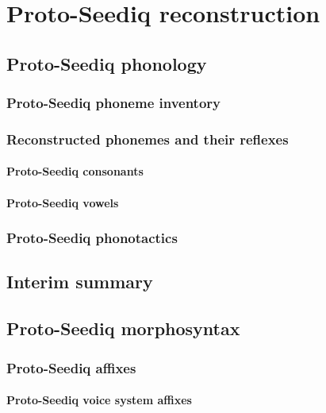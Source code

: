 \documentclass[master]{NTHUthesis}
\begin{document}
\chapter{Proto-Seediq reconstruction}
\lipsum[1-2]

\section{Proto-Seediq phonology}

\subsection{Proto-Seediq phoneme inventory}

\subsection{Reconstructed phonemes and their reflexes}

\subsubsection{Proto-Seediq consonants}

\subsubsection{Proto-Seediq vowels}

\subsection{Proto-Seediq phonotactics}

\section{Interim summary}
\lipsum[1]

\section{Proto-Seediq morphosyntax}

\subsection{Proto-Seediq affixes}

\subsubsection{Proto-Seediq voice system affixes}
\end{document}
